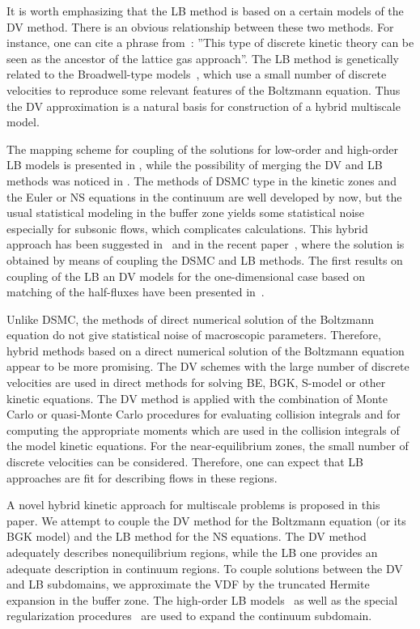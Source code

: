 \documentclass[]{elsarticle} %
\begin{document}
It is worth emphasizing that the LB method is based on a certain models of the DV method.
There is an obvious relationship between these two methods. For instance, one can cite a phrase from~\cite{Rivet2001}:
''This type of discrete kinetic theory can be seen as the ancestor of the lattice gas approach''.
The LB method is genetically related to the Broadwell-type models~\cite{Broadwell1964shock, Gatignol1975},
which use a small number of discrete velocities to reproduce some relevant features of the Boltzmann equation.
Thus the DV approximation is a natural basis for construction of a hybrid multiscale model.

The mapping scheme for coupling of the solutions for low-order and high-order LB models is presented in \cite{Meng2011},
while the possibility of merging the DV and LB methods was noticed in \cite{Succi2016}.
The methods of DSMC type in the kinetic zones and the Euler or NS equations in the continuum are well developed by now,
but the usual statistical modeling in the buffer zone yields some statistical noise especially for subsonic flows, which complicates calculations.
This hybrid approach has been suggested in~\cite{Staso2016short, Staso2016long} and in the recent paper~\cite{Staso2018},
where the solution is obtained by means of coupling the DSMC and LB methods.
The first results on coupling of the LB an DV models for the one-dimensional case
based on matching of the half-fluxes have been presented in~\cite{Ilyin2018}.

Unlike DSMC, the methods of direct numerical solution of the Boltzmann equation do not give statistical noise of macroscopic parameters.
Therefore, hybrid methods based on a direct numerical solution of the Boltzmann equation appear to be more promising.
The DV schemes with the large number of discrete velocities are used in direct methods for solving BE, BGK, S-model or other kinetic equations.
The DV method is applied with the combination of Monte Carlo or quasi-Monte Carlo procedures for evaluating collision integrals
and for computing the appropriate moments which are used in the collision integrals of the model kinetic equations.
For the near-equilibrium zones, the small number of discrete velocities can be considered.
Therefore, one can expect that LB approaches are fit for describing flows in these regions.

A novel hybrid kinetic approach for multiscale problems is proposed in this paper.
We attempt to couple the DV method for the Boltzmann equation (or its BGK model) and the LB method for the NS equations.
The DV method adequately describes nonequilibrium regions, while the LB one provides an adequate description in continuum regions.
To couple solutions between the DV and LB subdomains, we approximate the VDF by the truncated Hermite expansion in the buffer zone.
The high-order LB models~\cite{Shan2006, Feuchter2016} as well as the special regularization procedures~\cite{Latt2006, Mont2015}
are used to expand the continuum subdomain.
\end{document}
